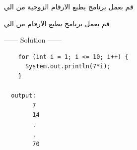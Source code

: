 \begin{task}
  \begin{AR}
    قم بعمل برنامج يطبع الارقام الزوجية من  الي 
  \end{AR}
\end{task}
\begin{task}
  \begin{AR}
    قم بعمل برنامج يطبع الارقام من  الي 
  \end{AR}
\end{task}

\newpage
\begin{example}
  \begin{center}
    ------ \textcolor{Solution}{Solution} ------ 
  \end{center} 
  \begin{verbatim}
    for (int i = 1; i <= 10; i++) {
      System.out.println(7*i);    
    }
      
  output:
        7
        14
        .
        .
        70
\end{verbatim}
\end{example}
